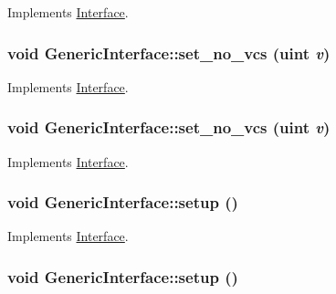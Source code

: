 Implements \hyperlink{classInterface_c458ee6d8e974cb0a9f90308d0feb16d}{Interface}.\hypertarget{classGenericInterface_10e019a3cafe243d63587656afc5e79f}{
\subsubsection[{set\_\-no\_\-vcs}]{\setlength{\rightskip}{0pt plus 5cm}void GenericInterface::set\_\-no\_\-vcs ({\bf uint} {\em v})}}
\label{classGenericInterface_10e019a3cafe243d63587656afc5e79f}




Implements \hyperlink{classInterface_e7266de6cc9e1dfd4bb3a1b8face3c15}{Interface}.\hypertarget{classGenericInterface_10e019a3cafe243d63587656afc5e79f}{
\subsubsection[{set\_\-no\_\-vcs}]{\setlength{\rightskip}{0pt plus 5cm}void GenericInterface::set\_\-no\_\-vcs ({\bf uint} {\em v})}}
\label{classGenericInterface_10e019a3cafe243d63587656afc5e79f}




Implements \hyperlink{classInterface_e7266de6cc9e1dfd4bb3a1b8face3c15}{Interface}.\hypertarget{classGenericInterface_1aaf2e40e433e913e7ea9cb68693fa7c}{
\subsubsection[{setup}]{\setlength{\rightskip}{0pt plus 5cm}void GenericInterface::setup ()}}
\label{classGenericInterface_1aaf2e40e433e913e7ea9cb68693fa7c}




Implements \hyperlink{classInterface_f9015204e6dabe3e0fce572b19cd1550}{Interface}.\hypertarget{classGenericInterface_1aaf2e40e433e913e7ea9cb68693fa7c}{
\subsubsection[{setup}]{\setlength{\rightskip}{0pt plus 5cm}void GenericInterface::setup ()}}
\label{classGenericInterface_1aaf2e40e433e913e7ea9cb68693fa7c}




